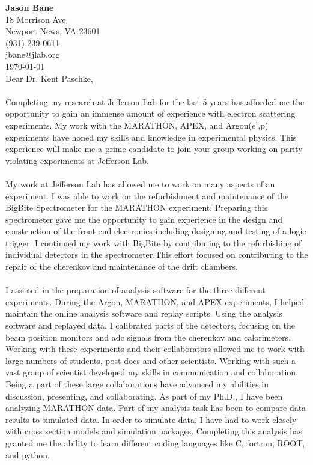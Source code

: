 \documentclass[12pt,letterpaper]{article}
\newcommand{\CPP}
{C\nolinebreak[4]\hspace{-.05em}\raisebox{.22ex}{\footnotesize\bf ++}}
\begin{document}
\vspace*{-1.2cm}
{\textbf{Jason Bane}}\\
18 Morrison Ave. \\
Newport News, VA 23601 \\
(931) 239-0611 \\
jbane@jlab.org \\
\today\\

Dear Dr. Kent Paschke, 

\paragraph{}Completing my research at Jefferson Lab for the last 5 years has afforded me the opportunity to gain an immense amount of experience with electron scattering experiments. My work with the MARATHON, APEX, and Argon($e^\prime$,p) experiments have honed my skills and knowledge in experimental physics. This experience will make me a prime candidate to join your group working on parity violating experiments at Jefferson Lab.
\paragraph{}My work at Jefferson Lab has allowed me to work on many aspects of an experiment. I was able to work on the refurbishment and maintenance of the BigBite Spectrometer for the MARATHON experiment. Preparing this spectrometer gave me the opportunity to gain experience in the design and construction of the front end electronics including designing and testing of a logic trigger. I continued my work with BigBite by contributing to the refurbishing of individual detectors in the spectrometer.This effort focused on contributing to the repair of the cherenkov and maintenance of the drift chambers. 
\paragraph{}I assisted in the preparation of analysis software for the three different experiments. During the Argon, MARATHON, and APEX experiments, I helped maintain the online analysis software and replay scripts. Using the analysis software and replayed data, I calibrated parts of the detectors, focusing on the beam position monitors and adc signals from the cherenkov and calorimeters. Working with these experiments and their collaborators allowed me to work with large numbers of students, post-docs and other scientists.  Working with such a vast group of scientist developed my skills in communication and collaboration. Being a part of these large collaborations have advanced my abilities in discussion, presenting, and collaborating.
As part of my Ph.D., I have been analyzing MARATHON data. Part of my analysis task has been to compare data results to simulated data. In order to simulate data, I have had to work closely with cross section models and simulation packages. Completing this analysis has granted me the ability to learn different coding languages like \CPP, fortran, ROOT, and python. 
\end{document}
